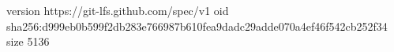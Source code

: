 version https://git-lfs.github.com/spec/v1
oid sha256:d999eb0b599f2db283e766987b610fea9dadc29adde070a4ef46f542cb252f34
size 5136
